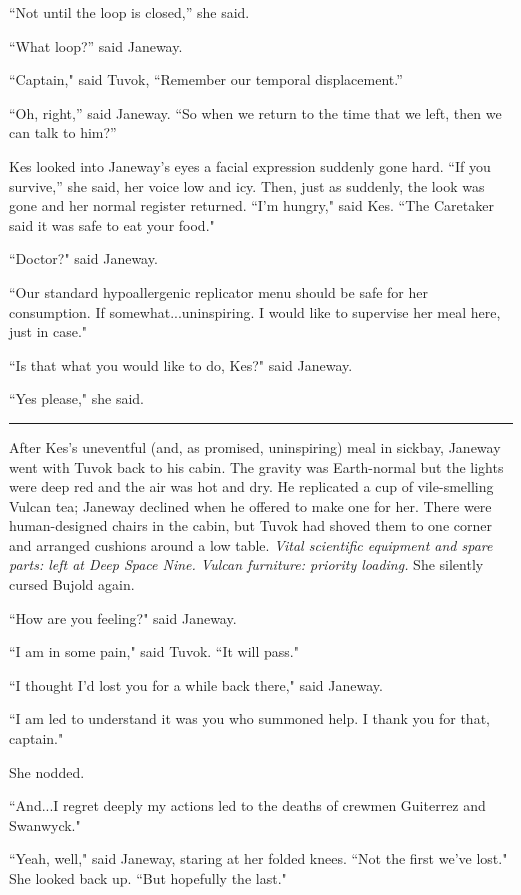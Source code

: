 \documentclass[twoside,letterpaper,12pt]{memoir}
\begin{document}
``Not until the loop is closed,” she said. 

``What loop?” said Janeway. 

``Captain," said Tuvok, ``Remember our temporal displacement.” 

``Oh, right,” said Janeway. ``So when we return to the time that we left, then we can talk to him?” 

Kes looked into Janeway’s eyes a facial expression suddenly gone hard. ``If you survive,” she said, her voice low and icy. Then, just as suddenly, the look was gone and her normal register returned. ``I'm hungry," said Kes. ``The Caretaker said it was safe to eat your food." 

``Doctor?" said Janeway. 

``Our standard hypoallergenic replicator menu should be safe for her consumption. If somewhat...uninspiring. I would like to supervise her meal here, just in case." 

``Is that what you would like to do, Kes?" said Janeway. 

``Yes please," she said. 

\begin{center}\rule{3cm}{0.4 pt}\end{center} 

After Kes's uneventful (and, as promised, uninspiring) meal in sickbay, Janeway went with Tuvok back to his cabin. The gravity was Earth-normal but the lights were deep red and the air was hot and dry. He replicated a cup of vile-smelling Vulcan tea; Janeway declined when he offered to make one for her. There were human-designed chairs in the cabin, but Tuvok had shoved them to one corner and arranged cushions around a low table. \textit{Vital scientific equipment and spare parts: left at Deep Space Nine. Vulcan furniture: priority loading. }She silently cursed Bujold again. 

``How are you feeling?" said Janeway. 

``I am in some pain," said Tuvok. ``It will pass." 

``I thought I'd lost you for a while back there," said Janeway. 

``I am led to understand it was you who summoned help. I thank you for that, captain." 

She nodded. 

``And...I regret deeply my actions led to the deaths of crewmen Guiterrez and Swanwyck." 

``Yeah, well," said Janeway, staring at her folded knees. ``Not the first we've lost." She looked back up. ``But hopefully the last." 
\end{document}
